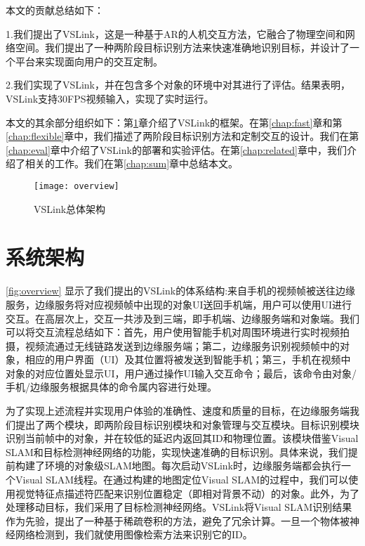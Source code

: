 本文的贡献总结如下：

1.我们提出了VSLink，这是一种基于AR的人机交互方法，它融合了物理空间和网络空间。我们提出了一种两阶段目标识别方法来快速准确地识别目标，并设计了一个平台来实现面向用户的交互定制。

2.我们实现了VSLink，并在包含多个对象的环境中对其进行了评估。结果表明，VSLink支持30FPS视频输入，实现了实时运行。

本文的其余部分组织如下：第\ref{chap:architec}章介绍了VSLink的框架。在第\ref{chap:fast}章和第\ref{chap:flexible}章中，我们描述了两阶段目标识别方法和定制交互的设计。我们在第\ref{chap:eval}章中介绍了VSLink的部署和实验评估。在第\ref{chap:related}章中，我们介绍了相关的工作。我们在第\ref{chap:sum}章中总结本文。

\begin{figure}[t]
	\centering
	\texttt{[image: overview]}
	\caption{VSLink总体架构}
	\label{fig:overview}
\end{figure}

\chapter{系统架构}\label{chap:architec}

\autoref{fig:overview} 显示了我们提出的VSLink的体系结构:来自手机的视频帧被送往边缘服务，边缘服务将对应视频帧中出现的对象UI送回手机端，用户可以使用UI进行交互。在高层次上，交互一共涉及到三端，即手机端、边缘服务端和对象端。我们可以将交互流程总结如下：首先，用户使用智能手机对周围环境进行实时视频拍摄，视频流通过无线链路发送到边缘服务端；第二，边缘服务识别视频帧中的对象，相应的用户界面（UI）及其位置将被发送到智能手机；第三，手机在视频中对象的对应位置处显示UI，用户通过操作UI输入交互命令；最后，该命令由对象/手机/边缘服务根据具体的命令属内容进行处理。

为了实现上述流程并实现用户体验的准确性、速度和质量的目标，在边缘服务端我们提出了两个模块，即两阶段目标识别模块和对象管理与交互模块。目标识别模块识别当前帧中的对象，并在较低的延迟内返回其ID和物理位置。该模块借鉴Visual SLAM和目标检测神经网络的功能，实现快速准确的目标识别。具体来说，我们提前构建了环境的对象级SLAM地图。每次启动VSLink时，边缘服务端都会执行一个Visual SLAM线程。在通过构建的地图定位Visual SLAM的过程中，我们可以使用视觉特征点描述符匹配来识别位置稳定（即相对背景不动）的对象。此外，为了处理移动目标，我们采用了目标检测神经网络。VSLink将Visual SLAM识别结果作为先验，提出了一种基于稀疏卷积的方法，避免了冗余计算。一旦一个物体被神经网络检测到，我们就使用图像检索方法来识别它的ID。

